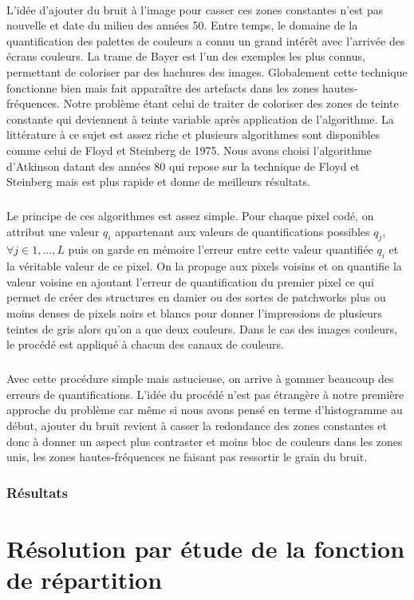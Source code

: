 \documentclass{article}
\begin{document}
\paragraph*{}
L'idée d'ajouter du bruit à l'image pour casser ces zones constantes n'est pas nouvelle et date du milieu des années 50. Entre temps, le domaine de la quantification des palettes de couleurs a connu un grand intérêt avec l'arrivée des écrans couleurs. La trame de Bayer est l'un des exemples les plus connus, permettant de coloriser par des hachures des images. Globalement cette technique fonctionne bien mais fait apparaître des artefacts dans les zones hautes-fréquences. Notre problème étant celui de traiter de coloriser des zones de teinte constante qui deviennent à teinte variable après application de l'algorithme. La littérature à ce sujet est assez riche et plusieurs algorithmes sont disponibles comme celui de Floyd et Steinberg de 1975. Nous avons choisi l'algorithme d'Atkinson datant des années 80 qui repose sur la technique de Floyd et Steinberg mais est plus rapide et donne de meilleurs résultats.
\subparagraph*{}
Le principe de ces algorithmes est assez simple. Pour chaque pixel codé, on attribut une valeur $q_i$ appartenant aux valeurs de quantifications possibles $q_j$, $\forall j \in {1,..., L}$ puis on garde en mémoire l'erreur entre cette valeur quantifiée $q_i$ et la véritable valeur de ce pixel. On la propage aux pixels voisins et on quantifie la valeur voisine en ajoutant l'erreur de quantification du premier pixel ce qui permet de créer des structures en damier ou des sortes de patchworks plus ou moins denses de pixels noirs et blancs pour donner l'impressions de plusieurs teintes de gris alors qu'on a que deux couleurs. Dans le cas des images couleurs, le procédé est appliqué à chacun des canaux de couleurs.
\subparagraph*{}
Avec cette procédure simple mais astucieuse, on arrive à gommer beaucoup des erreurs de quantifications. L'idée du procédé n'est pas étrangère à notre première approche du problème car même si nous avons pensé en terme d'histogramme au début, ajouter du bruit revient à casser la redondance des zones constantes et donc à donner un aspect plus contraster et moins bloc de couleurs dans les zones unis, les zones hautes-fréquences ne faisant pas ressortir le grain du bruit.

\subsubsection*{Résultats}

\section*{Résolution par étude de la fonction de répartition}
\end{document}

